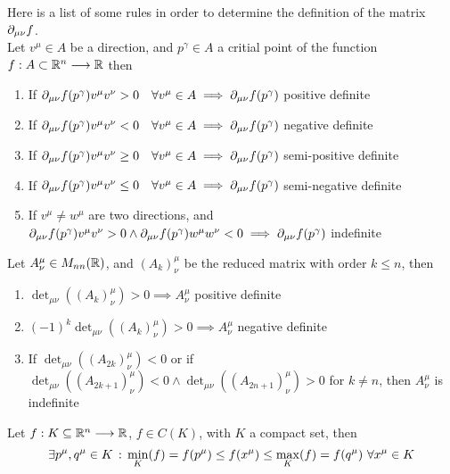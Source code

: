 \documentclass[../complete.tex]{subfiles}
\begin{document}
\begin{thm}
	Here is a list of some rules in order to determine the definition of the matrix $\partial_{\mu\nu}f$.\\
	Let $v^\mu\in A$ be a direction, and $p^\gamma\in A$ a critial point of the function $f:A\subset\mathbb{R}^n\overset{}{\longrightarrow}\mathbb{R}$ then
	\begin{enumerate}
	\item If $\partial_{\mu\nu}f(p^\gamma)v^\mu v^\nu>0\quad\forall v^\mu\in A\implies\partial_{\mu\nu}f(p^\gamma)$ positive definite
	\item If $\partial_{\mu\nu}f(p^\gamma)v^\mu v^\nu<0\quad\forall v^\mu\in A\implies\partial_{\mu\nu}f(p^\gamma)$ negative definite
	\item If $\partial_{\mu\nu}f(p^\gamma)v^\mu v^\nu\ge0\quad\forall v^\mu\in A\implies\partial_{\mu\nu}f(p^\gamma)$ semi-positive definite
	\item If $\partial_{\mu\nu}f(p^\gamma)v^\mu v^\nu\le0\quad\forall v^\mu\in A\implies\partial_{\mu\nu}f(p^\gamma)$ semi-negative definite
	\item If $v^\mu\ne w^\mu$ are two directions, and $\partial_{\mu\nu}f(p^\gamma)v^\mu v^\nu>0\wedge\partial_{\mu\nu}f(p^\gamma)w^\mu w^\nu<0\implies\partial_{\mu\nu}f(p^\gamma)$ indefinite
	\end{enumerate}
\end{thm}
\begin{thm}
	Let $A^\mu_\nu\in M_{nn}(\mathbb{R})$, and $(A_k)^\mu_\nu$ be the reduced matrix with order $k\le n$, then
	\begin{enumerate}
	\item $\det_{\mu\nu}\left( (A_k)^\mu_\nu \right)>0\implies A^\mu_\nu$ positive definite
	\item $(-1)^k\det_{\mu\nu}\left( (A_k)^\mu_\nu \right)>0\implies A^\mu_\nu$ negative definite
	\item If $\det_{\mu\nu}\left( (A_{2k})^\mu_\nu \right)<0$ or if $\det_{\mu\nu}\left( (A_{2k+1})^\mu_\nu \right)<0\wedge\det_{\mu\nu}\left( (A_{2n+1})^\mu_\nu \right)>0$ for $k\ne n$, then $A^\mu_\nu$ is indefinite
	\end{enumerate}
\end{thm}
\begin{thm}
	Let $f:K\subseteq\mathbb{R}^n\overset{}{\longrightarrow}\mathbb{R}$, $f\in C(K)$, with $K$ a compact set, then
	\begin{equation}
		\exists p^\mu,q^\mu\in K\, :\, \min_K(f)=f(p^\mu)\le f(x^\mu)\le\max_K(f)=f(q^\mu)\ \forall x^\mu\in K
		\label{eq:weierstrass}
	\end{equation}
\end{thm}
\end{document}
